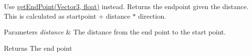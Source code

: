 
\begin{DoxyRefList}
\item[\label{deprecated__deprecated000001}%
\hypertarget{deprecated__deprecated000001}{}%
Member \hyperlink{classairhockeyjava_1_1util_1_1collision_1_1_ray_a8d155d838b8d37137ec2ba6cc7166283}{airhockeyjava.util.collision.Ray.get\+End\+Point} (float distance)]Use \hyperlink{}{get\+End\+Point(\+Vector3, float)} instead. Returns the endpoint given the distance. This is calculated as startpoint + distance $\ast$ direction. 
\begin{DoxyParams}{Parameters}
{\em distance} & The distance from the end point to the start point. \\
\hline
\end{DoxyParams}
\begin{DoxyReturn}{Returns}
The end point 
\end{DoxyReturn}

\end{DoxyRefList}